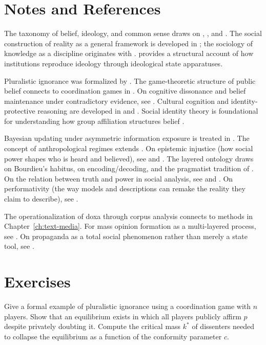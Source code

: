 \section{Notes and References}
\label{sec:ch2-notes}

The taxonomy of belief, ideology, and common sense draws on \textcite{gramsci1971}, \textcite{bourdieu1984}, and \textcite{foucault1971}.
The social construction of reality as a general framework is developed in \textcite{berger1966}; the sociology of knowledge as a discipline originates with \textcite{mannheim1936}.
\textcite{althusser1970} provides a structural account of how institutions reproduce ideology through ideological state apparatuses.

Pluralistic ignorance was formalized by \textcite{kuran1995}.
The game-theoretic structure of public belief connects to coordination games in \textcite{schelling1978}.
On cognitive dissonance and belief maintenance under contradictory evidence, see \textcite{festinger1957}.
Cultural cognition and identity-protective reasoning are developed in \textcite{kahan2012} and \textcite{mercier2017}.
Social identity theory is foundational for understanding how group affiliation structures belief \autocite{tajfel1979}.

Bayesian updating under asymmetric information exposure is treated in \textcite{gentzkow2010}.
The concept of anthropological regimes extends \textcite{gintis2005}.
On epistemic injustice (how social power shapes who is heard and believed), see \textcite{fricker2007} and \textcite{medina2013}.
The layered ontology draws on Bourdieu's habitus, \textcite{hall1980} on encoding/decoding, and the pragmatist tradition of \textcite{dewey1927}.
On the relation between truth and power in social analysis, see \textcite{mannheim1936} and \textcite{jasanoff2004}.
On performativity (the way models and descriptions can remake the reality they claim to describe), see \textcite{mackenzie2006}.

The operationalization of doxa through corpus analysis connects to methods in Chapter~\ref{ch:text-media}.
For mass opinion formation as a multi-layered process, see \textcite{zaller1992}.
On propaganda as a total social phenomenon rather than merely a state tool, see \textcite{ellul1965}.


\section{Exercises}

\begin{exercise}
\label{ex:ch2-coordination}
Give a formal example of pluralistic ignorance using a coordination game with $n$ players.
Show that an equilibrium exists in which all players publicly affirm $p$ despite privately doubting it.
Compute the critical mass $k^*$ of dissenters needed to collapse the equilibrium as a function of the conformity parameter $c$.
\end{exercise}

